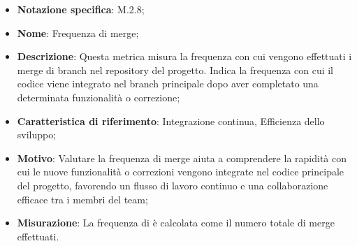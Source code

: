 \begin{itemize}
    \item \textbf{Notazione specifica}: M.2.8;
    \item \textbf{Nome}: Frequenza di merge;
    \item \textbf{Descrizione}: Questa metrica misura la frequenza con cui vengono effettuati i merge di branch nel repository del progetto. Indica la frequenza con cui il codice viene integrato nel branch principale dopo aver completato una determinata funzionalità o correzione;
    \item \textbf{Caratteristica di riferimento}: Integrazione continua, Efficienza dello sviluppo;
    \item \textbf{Motivo}: Valutare la frequenza di merge aiuta a comprendere la rapidità con cui le nuove funzionalità o correzioni vengono integrate nel codice principale del progetto, favorendo un flusso di lavoro continuo e una collaborazione efficace tra i membri del team;
    \item \textbf{Misurazione}: La frequenza di  è calcolata come il numero totale di merge effettuati.
   
   
   
\end{itemize}
